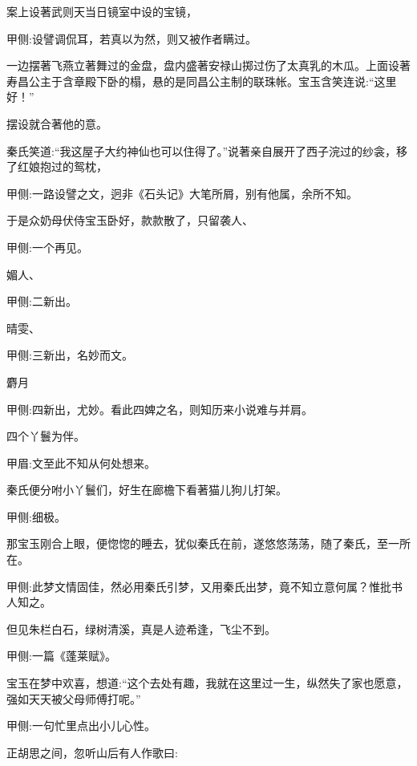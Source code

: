 \begin{parag}
    案上设著武则天当日镜室中设的宝镜，\begin{note}甲侧:设譬调侃耳，若真以为然，则又被作者瞒过。\end{note}一边摆著飞燕立著舞过的金盘，盘内盛著安禄山掷过伤了太真乳的木瓜。上面设著寿昌公主于含章殿下卧的榻，悬的是同昌公主制的联珠帐。宝玉含笑连说:“这里好！”\begin{note}摆设就合著他的意。\end{note}秦氏笑道:“我这屋子大约神仙也可以住得了。”说著亲自展开了西子浣过的纱衾，移了红娘抱过的鸳枕，\begin{note}甲侧:一路设譬之文，迥非《石头记》大笔所屑，别有他属，余所不知。\end{note}于是众奶母伏侍宝玉卧好，款款散了，只留袭人、\begin{note}甲侧:一个再见。\end{note}媚人、\begin{note}甲侧:二新出。\end{note}晴雯、\begin{note}甲侧:三新出，名妙而文。\end{note}麝月\begin{note}甲侧:四新出，尤妙。看此四婢之名，则知历来小说难与并肩。\end{note}四个丫鬟为伴。\begin{note}甲眉:文至此不知从何处想来。\end{note}秦氏便分咐小丫鬟们，好生在廊檐下看著猫儿狗儿打架。\begin{note}甲侧:细极。\end{note}
\end{parag}


\begin{parag}
    那宝玉刚合上眼，便惚惚的睡去，犹似秦氏在前，遂悠悠荡荡，随了秦氏，至一所在。\begin{note}甲侧:此梦文情固佳，然必用秦氏引梦，又用秦氏出梦，竟不知立意何属？惟批书人知之。\end{note}但见朱栏白石，绿树清溪，真是人迹希逢，飞尘不到。\begin{note}甲侧:一篇《蓬莱赋》。\end{note}宝玉在梦中欢喜，想道:“这个去处有趣，我就在这里过一生，纵然失了家也愿意，强如天天被父母师傅打呢。”\begin{note}甲侧:一句忙里点出小儿心性。\end{note}正胡思之间，忽听山后有人作歌曰:
\end{parag}


